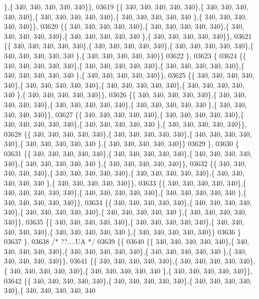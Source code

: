 \begin{DoxyCode}
      \},\{ 340, 340, 340, 340, 340\}\},
03619 \{\{ 340, 340, 340, 340, 340\},\{ 340, 340, 340, 340, 340\},\{ 340, 340, 340, 340, 340\},\{ 340, 340, 340, 340, 340
      \},\{ 340, 340, 340, 340, 340\}\},
03620 \{\{ 340, 340, 340, 340, 340\},\{ 340, 340, 340, 340, 340\},\{ 340, 340, 340, 340, 340\},\{ 340, 340, 340, 340, 340
      \},\{ 340, 340, 340, 340, 340\}\},
03621 \{\{ 340, 340, 340, 340, 340\},\{ 340, 340, 340, 340, 340\},\{ 340, 340, 340, 340, 340\},\{ 340, 340, 340, 340, 340
      \},\{ 340, 340, 340, 340, 340\}\}
03622 \},
03623 \{
03624 \{\{ 340, 340, 340, 340, 340\},\{ 340, 340, 340, 340, 340\},\{ 340, 340, 340, 340, 340\},\{ 340, 340, 340, 340, 340
      \},\{ 340, 340, 340, 340, 340\}\},
03625 \{\{ 340, 340, 340, 340, 340\},\{ 340, 340, 340, 340, 340\},\{ 340, 340, 340, 340, 340\},\{ 340, 340, 340, 340, 340
      \},\{ 340, 340, 340, 340, 340\}\},
03626 \{\{ 340, 340, 340, 340, 340\},\{ 340, 340, 340, 340, 340\},\{ 340, 340, 340, 340, 340\},\{ 340, 340, 340, 340, 340
      \},\{ 340, 340, 340, 340, 340\}\},
03627 \{\{ 340, 340, 340, 340, 340\},\{ 340, 340, 340, 340, 340\},\{ 340, 340, 340, 340, 340\},\{ 340, 340, 340, 340, 340
      \},\{ 340, 340, 340, 340, 340\}\},
03628 \{\{ 340, 340, 340, 340, 340\},\{ 340, 340, 340, 340, 340\},\{ 340, 340, 340, 340, 340\},\{ 340, 340, 340, 340, 340
      \},\{ 340, 340, 340, 340, 340\}\}
03629 \},
03630 \{
03631 \{\{ 340, 340, 340, 340, 340\},\{ 340, 340, 340, 340, 340\},\{ 340, 340, 340, 340, 340\},\{ 340, 340, 340, 340, 340
      \},\{ 340, 340, 340, 340, 340\}\},
03632 \{\{ 340, 340, 340, 340, 340\},\{ 340, 340, 340, 340, 340\},\{ 340, 340, 340, 340, 340\},\{ 340, 340, 340, 340, 340
      \},\{ 340, 340, 340, 340, 340\}\},
03633 \{\{ 340, 340, 340, 340, 340\},\{ 340, 340, 340, 340, 340\},\{ 340, 340, 340, 340, 340\},\{ 340, 340, 340, 340, 340
      \},\{ 340, 340, 340, 340, 340\}\},
03634 \{\{ 340, 340, 340, 340, 340\},\{ 340, 340, 340, 340, 340\},\{ 340, 340, 340, 340, 340\},\{ 340, 340, 340, 340, 340
      \},\{ 340, 340, 340, 340, 340\}\},
03635 \{\{ 340, 340, 340, 340, 340\},\{ 340, 340, 340, 340, 340\},\{ 340, 340, 340, 340, 340\},\{ 340, 340, 340, 340, 340
      \},\{ 340, 340, 340, 340, 340\}\}
03636 \}
03637 \},
03638 \textcolor{comment}{/* ??....UA */}
03639 \{\{
03640 \{\{ 340, 340, 340, 340, 340\},\{ 340, 340, 340, 340, 340\},\{ 340, 340, 340, 340, 340\},\{ 340, 340, 340, 340, 340
      \},\{ 340, 340, 340, 340, 340\}\},
03641 \{\{ 340, 340, 340, 340, 340\},\{ 340, 340, 340, 340, 340\},\{ 340, 340, 340, 340, 340\},\{ 340, 340, 340, 340, 340
      \},\{ 340, 340, 340, 340, 340\}\},
03642 \{\{ 340, 340, 340, 340, 340\},\{ 340, 340, 340, 340, 340\},\{ 340, 340, 340, 340, 340\},\{ 340, 340, 340, 340, 340

\end{DoxyCode}
